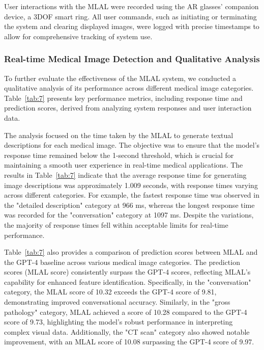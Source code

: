 \documentclass[10pt,letterpaper]{article}
\begin{document}
User interactions with the MLAL were recorded using the AR glasses' companion device, a 3DOF smart ring. All user commands, such as initiating or terminating the system and clearing displayed images, were logged with precise timestamps to allow for comprehensive tracking of system use.

\subsubsection*{Real-time Medical Image Detection and Qualitative Analysis}

To further evaluate the effectiveness of the MLAL system, we conducted a qualitative analysis of its performance across different medical image categories. Table~\ref{tab:7} presents key performance metrics, including response time and prediction scores, derived from analyzing system responses and user interaction data.

The analysis focused on the time taken by the MLAL to generate textual descriptions for each medical image. The objective was to ensure that the model's response time remained below the 1-second threshold, which is crucial for maintaining a smooth user experience in real-time medical applications. The results in Table~\ref{tab:7} indicate that the average response time for generating image descriptions was approximately 1.009 seconds, with response times varying across different categories. For example, the fastest response time was observed in the "detailed description" category at 966 ms, whereas the longest response time was recorded for the "conversation" category at 1097 ms. Despite the variations, the majority of response times fell within acceptable limits for real-time performance.

Table~\ref{tab:7} also provides a comparison of prediction scores between MLAL and the GPT-4 baseline across various medical image categories. The prediction scores (MLAL score) consistently surpass the GPT-4 scores, reflecting MLAL's capability for enhanced feature identification. Specifically, in the "conversation" category, the MLAL score of 10.32 exceeds the GPT-4 score of 9.81, demonstrating improved conversational accuracy. Similarly, in the "gross pathology" category, MLAL achieved a score of 10.28 compared to the GPT-4 score of 9.73, highlighting the model's robust performance in interpreting complex visual data. Additionally, the "CT scan" category also showed notable improvement, with an MLAL score of 10.08 surpassing the GPT-4 score of 9.97.
\end{document}
